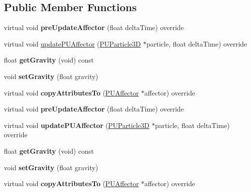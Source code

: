 \subsection*{Public Member Functions}
\begin{DoxyCompactItemize}
\item 
\mbox{\label{classPUGravityAffector_add67b5cb69af2d29fbd398f5c957a3a8}} 
virtual void {\bfseries pre\+Update\+Affector} (float delta\+Time) override
\item 
virtual void \hyperlink{classPUGravityAffector_abf3586107daa7e03a11cdc346652132f}{update\+P\+U\+Affector} (\hyperlink{structPUParticle3D}{P\+U\+Particle3D} $\ast$particle, float delta\+Time) override
\item 
\mbox{\label{classPUGravityAffector_a212f8e645182719aa7c9dce52c9b189e}} 
float {\bfseries get\+Gravity} (void) const
\item 
\mbox{\label{classPUGravityAffector_ac88c6b28629d56f8b408d71fad74be11}} 
void {\bfseries set\+Gravity} (float gravity)
\item 
\mbox{\label{classPUGravityAffector_a052b87f4ac80173a7530760fcedbbc97}} 
virtual void {\bfseries copy\+Attributes\+To} (\hyperlink{classPUAffector}{P\+U\+Affector} $\ast$affector) override
\item 
\mbox{\label{classPUGravityAffector_ab64ccd09668f7d3586064a17d85da0c5}} 
virtual void {\bfseries pre\+Update\+Affector} (float delta\+Time) override
\item 
\mbox{\label{classPUGravityAffector_a3ae4610ef24098e78aec0225829dba27}} 
virtual void {\bfseries update\+P\+U\+Affector} (\hyperlink{structPUParticle3D}{P\+U\+Particle3D} $\ast$particle, float delta\+Time) override
\item 
\mbox{\label{classPUGravityAffector_a212f8e645182719aa7c9dce52c9b189e}} 
float {\bfseries get\+Gravity} (void) const
\item 
\mbox{\label{classPUGravityAffector_ac88c6b28629d56f8b408d71fad74be11}} 
void {\bfseries set\+Gravity} (float gravity)
\item 
\mbox{\label{classPUGravityAffector_a3331221e060eead7742a5f9aedc290c2}} 
virtual void {\bfseries copy\+Attributes\+To} (\hyperlink{classPUAffector}{P\+U\+Affector} $\ast$affector) override
\end{DoxyCompactItemize}
